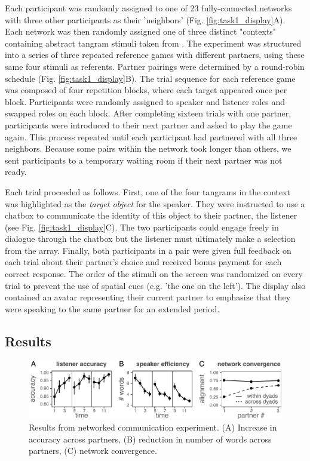 Each participant was randomly assigned to one of 23 fully-connected networks with three other participants as their 'neighbors' (Fig. \ref{fig:task1_display}A). 
Each network was then randomly assigned one of three distinct "contexts" containing abstract tangram stimuli taken from \cite{ClarkWilkesGibbs86_ReferringCollaborative}.
The experiment was structured into a series of three repeated reference games with different partners, using these same four stimuli as referents.
Partner pairings were determined by a round-robin schedule (Fig. \ref{fig:task1_display}B).
The trial sequence for each reference game was composed of four repetition blocks, where each target appeared once per block.
Participants were randomly assigned to speaker and listener roles and swapped roles on each block.
After completing sixteen trials with one partner, participants were introduced to their next partner and asked to play the game again. 
This process repeated until each participant had partnered with all three neighbors.
Because some pairs within the network took longer than others, we sent participants to a temporary waiting room if their next partner was not ready. 

Each trial proceeded as follows.
First, one of the four tangrams in the context was highlighted as the \emph{target object} for the speaker.
They were instructed to use a chatbox to communicate the identity of this object to their partner, the listener (see Fig. \ref{fig:task1_display}C).
The two participants could engage freely in dialogue through the chatbox but the listener must ultimately make a selection from the array. 
Finally, both participants in a pair were given full feedback on each trial about their partner's choice and received bonus payment for each correct response. 
The order of the stimuli on the screen was randomized on every trial to prevent the use of spatial cues (e.g. 'the one on the left').
The display also contained an avatar representing their current partner to emphasize that they were speaking to the same partner for an extended period.

\subsection{Results}

\begin{figure}
\includegraphics[scale=1]{./figures/sec3-empirical-results.pdf}
\caption{Results from networked communication experiment. (A) Increase in accuracy across partners, (B) reduction in number of words across partners, (C) network convergence.}
\label{fig:results}
\end{figure}

